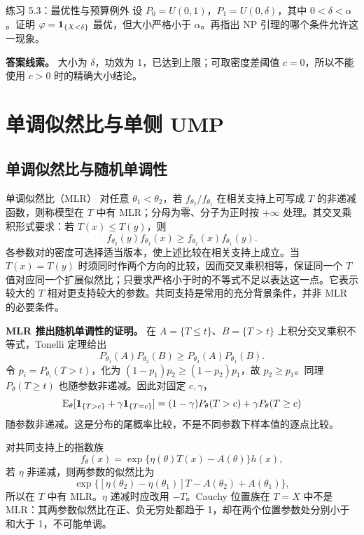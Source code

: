 \begin{examplebox}{练习 5.3：最优性与预算例外}
设 $P_0=U(0,1)$，$P_1=U(0,\delta)$，其中 $0<\delta<\alpha$。证明 $\varphi=\mathbf 1_{\{X<\delta\}}$ 最优，但大小严格小于 $\alpha$。再指出 NP 引理的哪个条件允许这一现象。

\textbf{答案线索。} 大小为 $\delta$，功效为 1，已达到上限；可取密度差阈值 $c=0$，所以不能使用 $c>0$ 时的精确大小结论。
\end{examplebox}

\section{单调似然比与单侧 UMP}

\subsection{单调似然比与随机单调性}

\begin{definitionbox}{单调似然比（MLR）}
对任意 $\theta_1<\theta_2$，若 $f_{\theta_2}/f_{\theta_1}$ 在相关支持上可写成 $T$ 的非递减函数，则称模型在 $T$ 中有 MLR；分母为零、分子为正时按 $+\infty$ 处理。其交叉乘积形式要求：若 $T(x)\le T(y)$，则
\[
 f_{\theta_2}(y)f_{\theta_1}(x)
 \ge f_{\theta_2}(x)f_{\theta_1}(y).
\]
各参数对的密度可选择适当版本，使上述比较在相关支持上成立。当 $T(x)=T(y)$ 时须同时作两个方向的比较，因而交叉乘积相等，保证同一个 $T$ 值对应同一个扩展似然比；只要求严格小于时的不等式不足以表达这一点。它表示较大的 $T$ 相对更支持较大的参数。共同支持是常用的充分背景条件，并非 MLR 的必要条件。
\end{definitionbox}

\textbf{MLR 推出随机单调性的证明。}
在 $A=\{T\le t\}$、$B=\{T>t\}$ 上积分交叉乘积不等式，Tonelli 定理给出
\[
 P_{\theta_1}(A)P_{\theta_2}(B)
 \ge P_{\theta_2}(A)P_{\theta_1}(B).
\]
令 $p_i=P_{\theta_i}(T>t)$，化为 $(1-p_1)p_2\ge(1-p_2)p_1$，故 $p_2\ge p_1$。同理 $P_\theta(T\ge t)$ 也随参数非递减。因此对固定 $c,\gamma$，
\[
 \operatorname{E}_\theta[\mathbf 1_{\{T>c\}}+\gamma\mathbf 1_{\{T=c\}}]
 =(1-\gamma)P_\theta(T>c)+\gamma P_\theta(T\ge c)
\]
随参数非递减。这是分布的尾概率比较，不是不同参数下样本值的逐点比较。

对共同支持上的指数族
\[
 f_\theta(x)=\exp\{\eta(\theta)T(x)-A(\theta)\}h(x),
\]
若 $\eta$ 非递减，则两参数的似然比为
\[
 \exp\{[\eta(\theta_2)-\eta(\theta_1)]T
                  -A(\theta_2)+A(\theta_1)\},
\]
所以在 $T$ 中有 MLR。$\eta$ 递减时应改用 $-T$。Cauchy 位置族在 $T=X$ 中不是 MLR：其两参数似然比在正、负无穷处都趋于 1，却在两个位置参数处分别小于和大于 1，不可能单调。

